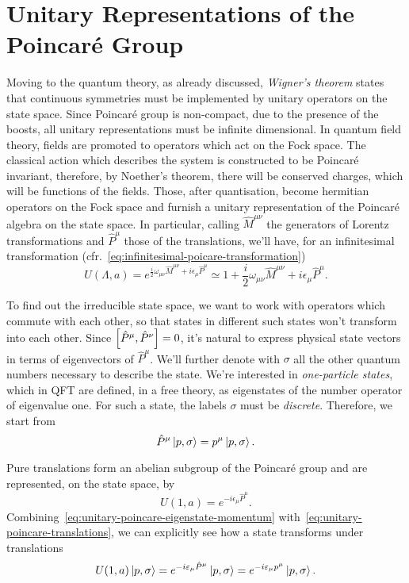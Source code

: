 \section{Unitary Representations of the Poincaré Group}
Moving to the quantum theory, as already discussed, \emph{Wigner's theorem} states that continuous symmetries must be implemented by unitary operators on the state space. Since Poincaré group is non-compact, due to the presence of the boosts, all unitary representations must be infinite dimensional. In quantum field theory, fields are promoted to operators which act on the Fock space. The classical action which describes the system is constructed to be Poincaré invariant, therefore, by Noether's theorem, there will be conserved charges, which will be functions of the fields. Those, after quantisation, become hermitian operators on the Fock space and furnish a unitary representation of the Poincaré algebra on the state space. In particular, calling $\hat{M}^{\mu\nu}$ the generators of Lorentz transformations and $\hat{P}^\mu$ those of the translations, we'll have, for an infinitesimal transformation (cfr.~\eqref{eq:infinitesimal-poicare-transformation})
\begin{equation}
    U(\Lambda,a) = e^{\frac{i}{2} \omega_{\mu\nu} \hat{M}^{\mu\nu} + i \epsilon_\mu \hat{P}^\mu} \simeq 1 + \frac{i}{2} \omega_{\mu\nu} \hat{M}^{\mu\nu} + i \epsilon_\mu \hat{P}^\mu .
\end{equation}

To find out the irreducible state space, we want to work with operators which commute with each other, so that states in different such states won't transform into each other. Since $\comm{\hat{P}^\mu}{\hat{P}^\nu} = 0$, it's natural to express physical state vectors in terms of eigenvectors of $\hat{P}^\mu$. We'll further denote with $\sigma$ all the other quantum numbers necessary to describe the state. We're interested in \emph{one-particle states}, which in QFT are defined, in a free theory, as eigenstates of the number operator of eigenvalue one. For such a state, the labels $\sigma$ must be \emph{discrete}. Therefore, we start from
\begin{equation}\label{eq:unitary-poincare-eigenstate-momentum}
    \hat{P}^\mu \ket{p,\sigma} = p^\mu \ket{p,\sigma} .
\end{equation}

Pure translations form an abelian subgroup of the Poincaré group and are represented, on the state space, by
\begin{equation}\label{eq:unitary-poincare-translations}
    U(1, a) = e^{-i \epsilon_\mu \hat{P}^\mu} .
\end{equation}
Combining~\eqref{eq:unitary-poincare-eigenstate-momentum} with~\eqref{eq:unitary-poincare-translations}, we can explicitly see how a state transforms under translations
\begin{equation}\label{eq:unitary-poincare-state-translation}
    U(1,a)\ket{p,\sigma} = e^{-i \varepsilon_\mu \hat{P}^\mu} \ket{p,\sigma} = e^{-i \varepsilon_\mu p^\mu} \ket{p,\sigma} .
\end{equation}

